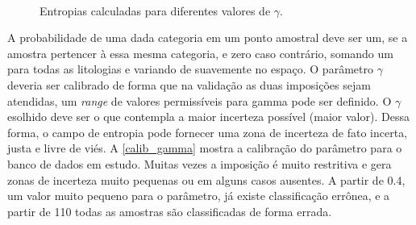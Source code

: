 \begin{figure}[t]
\caption{Entropias calculadas para diferentes valores de $\gamma$.} 
\label{entro_gamma}
\begin{center}
\\
\end{center}
\begin{center}
\end{center}
\end{figure}

A probabilidade de uma dada categoria em um ponto amostral deve ser um, se a amostra pertencer à essa mesma categoria, e zero caso contrário, somando um para todas as litologias e variando de suavemente no espaço. O parâmetro $\gamma$ deveria ser calibrado de forma que na validação as duas imposições sejam atendidas, um \textit{range} de valores permissíveis para gamma pode ser definido. O $\gamma$ esolhido deve ser o que contempla a maior incerteza possível (maior valor). Dessa forma, o campo de entropia pode fornecer uma zona de incerteza de fato incerta, justa e livre de viés. A \autoref{calib_gamma} mostra a calibração do parâmetro para o banco de dados em estudo. Muitas vezes a imposição é muito restritiva e gera zonas de incerteza muito pequenas ou em alguns casos ausentes. A partir de 0.4, um valor muito pequeno para o parâmetro, já existe classificação errônea, e a partir de 110 todas as amostras são classificadas de forma errada.

